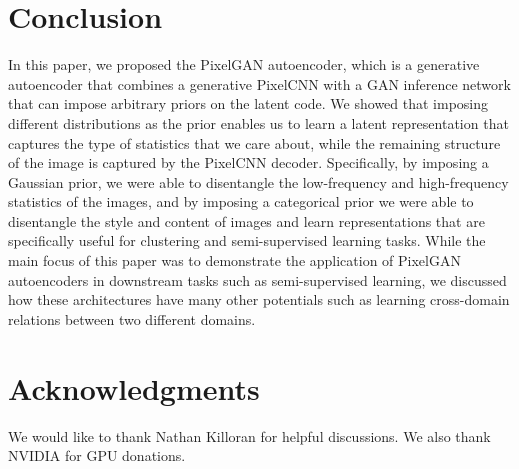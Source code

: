 \documentclass{article}
\begin{document}
\section{Conclusion}
In this paper, we proposed the PixelGAN autoencoder, which is a generative autoencoder that combines a generative PixelCNN with a GAN inference network that can impose arbitrary priors on the latent code. We showed that imposing different distributions as the prior enables us to learn a latent representation that captures the type of statistics that we care about, while the remaining structure of the image is captured by the PixelCNN decoder. Specifically, by imposing a Gaussian prior, we were able to disentangle the low-frequency and high-frequency statistics of the images, and by imposing a categorical prior we were able to disentangle the style and content of images and learn representations that are specifically useful for clustering and semi-supervised learning tasks.
While the main focus of this paper was to demonstrate the application of PixelGAN autoencoders in downstream tasks such as semi-supervised learning, we discussed how these architectures have many other potentials such as learning cross-domain relations between two different domains.

\section*{Acknowledgments}
We would like to thank Nathan Killoran for helpful discussions. We also thank NVIDIA for GPU donations.


{\fontsize{10}{1}\selectfont }
\newpage
\end{document}
